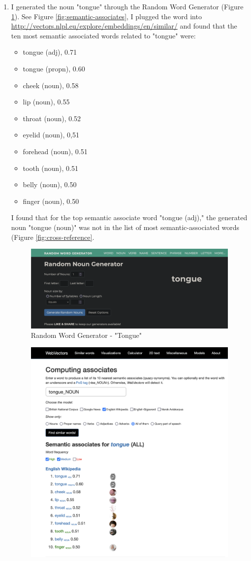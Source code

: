 \documentclass[12pt]{article}
\begin{document}
\begin{enumerate}
    \item I generated the noun "tongue" through the Random Word Generator (Figure \ref{fig:tongue}). See Figure \ref{fig:semantic-associates}, I plugged the word into \url{http://vectors.nlpl.eu/explore/embeddings/en/similar/} and found that the ten most semantic associated words related to "tongue" were:
    \begin{itemize}
        \item tongue (adj), 0.71
        \item tongue (propn), 0.60
        \item cheek (noun), 0.58
        \item lip (noun), 0.55
        \item throat (noun), 0.52
        \item eyelid (noun), 0,51
        \item forehead (noun), 0.51
        \item tooth (noun), 0.51
        \item belly (noun), 0.50
        \item finger (noun), 0.50
    \end{itemize}
    I found that for the top semantic associate word "tongue (adj)," the generated noun "tongue (noun)" was not in the list of most semantic-associated words (Figure \ref{fig:cross-reference}.
    \begin{figure}
        \centering
        \includegraphics[width=0.5\linewidth]{Q1-2-1.png}
        \caption{Random Word Generator - "Tongue"}
        \label{fig:tongue}
    \end{figure}
    \begin{figure}
        \centering
        \includegraphics[width=0.5\linewidth]{Q1-2-2.png}

\end{figure}
\end{enumerate}
\end{document}
